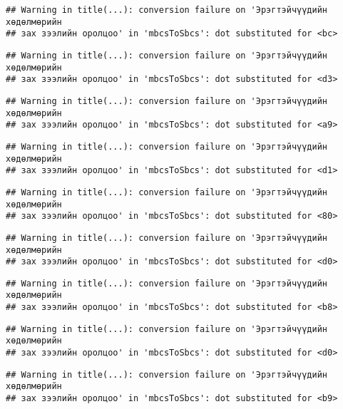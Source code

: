 \documentclass[]{article}
\begin{document}
\begin{verbatim}
## Warning in title(...): conversion failure on 'Эрэгтэйчүүдийн хөдөлмөрийн
## зах зээлийн оролцоо' in 'mbcsToSbcs': dot substituted for <bc>
\end{verbatim}

\begin{verbatim}
## Warning in title(...): conversion failure on 'Эрэгтэйчүүдийн хөдөлмөрийн
## зах зээлийн оролцоо' in 'mbcsToSbcs': dot substituted for <d3>
\end{verbatim}

\begin{verbatim}
## Warning in title(...): conversion failure on 'Эрэгтэйчүүдийн хөдөлмөрийн
## зах зээлийн оролцоо' in 'mbcsToSbcs': dot substituted for <a9>
\end{verbatim}

\begin{verbatim}
## Warning in title(...): conversion failure on 'Эрэгтэйчүүдийн хөдөлмөрийн
## зах зээлийн оролцоо' in 'mbcsToSbcs': dot substituted for <d1>
\end{verbatim}

\begin{verbatim}
## Warning in title(...): conversion failure on 'Эрэгтэйчүүдийн хөдөлмөрийн
## зах зээлийн оролцоо' in 'mbcsToSbcs': dot substituted for <80>
\end{verbatim}

\begin{verbatim}
## Warning in title(...): conversion failure on 'Эрэгтэйчүүдийн хөдөлмөрийн
## зах зээлийн оролцоо' in 'mbcsToSbcs': dot substituted for <d0>
\end{verbatim}

\begin{verbatim}
## Warning in title(...): conversion failure on 'Эрэгтэйчүүдийн хөдөлмөрийн
## зах зээлийн оролцоо' in 'mbcsToSbcs': dot substituted for <b8>
\end{verbatim}

\begin{verbatim}
## Warning in title(...): conversion failure on 'Эрэгтэйчүүдийн хөдөлмөрийн
## зах зээлийн оролцоо' in 'mbcsToSbcs': dot substituted for <d0>
\end{verbatim}

\begin{verbatim}
## Warning in title(...): conversion failure on 'Эрэгтэйчүүдийн хөдөлмөрийн
## зах зээлийн оролцоо' in 'mbcsToSbcs': dot substituted for <b9>
\end{verbatim}
\end{document}
